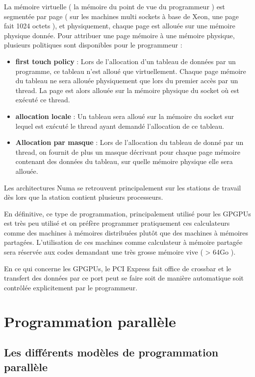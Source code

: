 \documentclass[fleqn,11pt]{article}
\begin{document}
La mémoire virtuelle ( la mémoire du point de vue du programmeur ) est segmentée
par page ( sur les machines multi sockets à base de Xeon, une page fait 1024 octets ),
et physiquement, chaque page est allouée sur une mémoire physique donnée.  
Pour attribuer une page mémoire à une mémoire physique, 
plusieurs politiques sont disponibles pour le programmeur : 
\begin{itemize}
\item \textbf{first touch policy} : Lors de l'allocation d'un tableau de
données par un programme, ce tableau n'est alloué que virtuellement. Chaque
page mémoire du tableau ne sera allouée physiquement que lors du premier accès
par un thread. La page est alors allouée sur la mémoire physique du socket où
est exécuté ce thread.
\item \textbf{allocation locale} : Un tableau sera alloué sur la mémoire du socket
sur lequel est exécuté le thread ayant demandé l'allocation de ce tableau.
\item \textbf{Allocation par masque} : Lors de l'allocation du tableau de donné par
un thread, on fournit de plus un masque décrivant pour chaque page mémoire contenant
des données du tableau, sur quelle mémoire physique elle sera allouée.
\end{itemize}

Les architectures Numa se retrouvent principalement sur les stations de travail
dès lors que la station contient plusieurs processeurs. 

En définitive, ce type de programmation, principalement utilisé pour les
GPGPUs est très peu utilisé et on préfère programmer pratiquement ces calculateurs
comme des machines à mémoires distribuées plutôt que des machines à mémoires
partagées. L'utilisation de ces machines comme calculateur à mémoire partagée
sera réservée aux codes demandant une très grosse mémoire vive ( > 64Go ).

En ce qui concerne les GPGPUs, le PCI Express fait office de crossbar et
le transfert des données par ce port peut se faire soit de manière automatique
soit contrôlée explicitement par le programmeur.

\section{Programmation parallèle}

\subsection{Les différents modèles de programmation parallèle}
\end{document}
